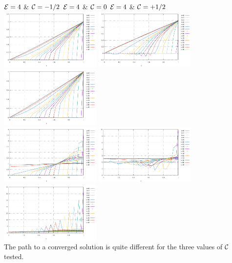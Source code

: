 \begin{center}
${\cal E}=4$ \& ${\cal C}=-1/2$  \hspace{2cm}
${\cal E}=4$ \& ${\cal C}=0$ \hspace{2cm}
${\cal E}=4$ \& ${\cal C}=+1/2$\\
\includegraphics[width=5cm]{python_codes/fieldstone_57/results/E04_Cm0p5/T_minus_evol}
\includegraphics[width=5cm]{python_codes/fieldstone_57/results/E04_C000/T_minus_evol}
\includegraphics[width=5cm]{python_codes/fieldstone_57/results/E04_Cp0p5/T_minus_evol}\\
\includegraphics[width=5cm]{python_codes/fieldstone_57/results/E04_Cm0p5/q_minus_evol}
\includegraphics[width=5cm]{python_codes/fieldstone_57/results/E04_C000/q_minus_evol}
\includegraphics[width=5cm]{python_codes/fieldstone_57/results/E04_Cp0p5/q_minus_evol}\\
{\captionfont The path to a converged solution is quite different for the three values 
of ${\cal C}$ tested.} 
\end{center}




